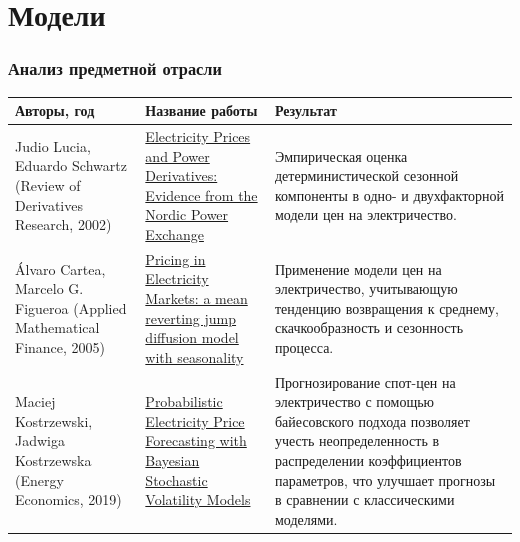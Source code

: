 \documentclass[c, dvipsnames]{beamer}  %
\begin{document}
\section{Модели}


\begin{frame}[shrink=5]
\frametitle{Анализ предметной отрасли} 



\begin{table} \small\centering\setlength{\extrarowheight}{0.25em}
	
	\begin{tabular}{   >{\centering\footnotesize}p{7.5em} 
			>{\centering\footnotesize}p{10em}
			>{\centering\footnotesize\arraybackslash}p{18em} }\hline
		
		
		
		Авторы, год & Название работы &  Результат \\\hline 
		
		
		
		Judio Lucia, Eduardo Schwartz (Review of Derivatives Research, 2002) & \href{https://link.springer.com/article/10.1023\%2FA\%3A1013846631785}{Electricity Prices and Power Derivatives: Evidence from the Nordic Power Exchange}  &   Эмпирическая оценка детерминистической сезонной компоненты   в одно- и двухфакторной модели  цен на электричество.  \\
		
		
		Álvaro Cartea, Marcelo G. Figueroa (Applied Mathematical Finance, 2005) & \href{https://www.researchgate.net/publication/24071715_Pricing_in_Electricity_Markets_A_Mean_Reverting_Jump_Diffusion_Model_with_Seasonality}{Pricing in Electricity Markets: a mean reverting
			jump diffusion model with seasonality}  &   Применение  модели цен на электричество,  учитывающую тенденцию возвращения к среднему, скачкообразность и сезонность процесса.    \\
		
		
		Maciej Kostrzewski, Jadwiga Kostrzewska (Energy Economics, 2019) & \href{https://www.researchgate.net/publication/331065098_Probabilistic_Electricity_Price_Forecasting_with_Bayesian_Stochastic_Volatility_Models}{Probabilistic Electricity Price Forecasting with Bayesian Stochastic Volatility Models}  &   Прогнозирование спот-цен на электричество с помощью  байесовского подхода  позволяет учесть  неопределенность в распределении коэффициентов параметров, что улучшает прогнозы в сравнении с классическими моделями.  
		

\end{tabular}
\end{table}
\end{frame}
\end{document}
